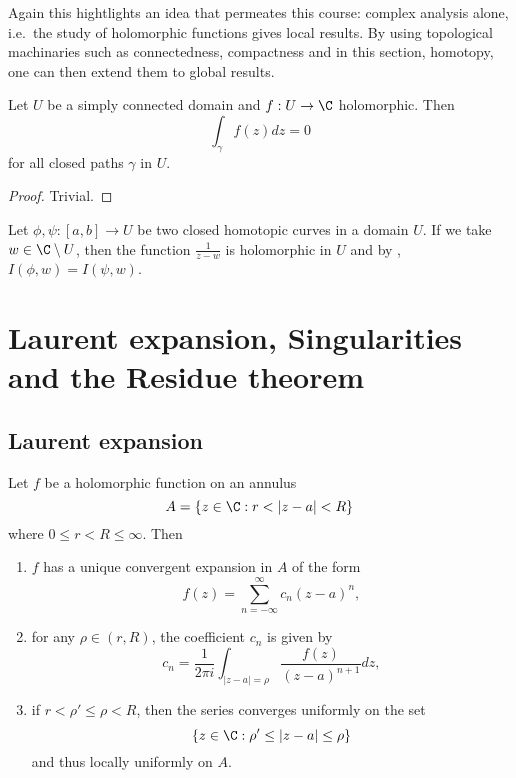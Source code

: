 \documentclass[a4paper]{article}
\begin{document}
Again this hightlights an idea that permeates this course: complex analysis alone, i.e.\ the study of holomorphic functions gives local results. By using topological machinaries such as connectedness, compactness and in this section, homotopy, one can then extend them to global results.

\begin{corollary}
  Let \(U\) be a simply connected domain and \(f: U \to \C\) holomorphic. Then
  \[
    \int_\gamma f(z)dz = 0
  \]
  for all closed paths \(\gamma\) in \(U\).
\end{corollary}

\begin{proof}
  Trivial.
\end{proof}

\begin{remark}
  Let \(\phi, \psi: [a, b] \to U\) be two closed homotopic curves in a domain \(U\). If we take \(w \in \C \setminus U\), then the function \(\frac{1}{z - w}\) is holomorphic in \(U\) and by , \(I(\phi, w) = I(\psi, w)\).
\end{remark}

\section{Laurent expansion, Singularities and the Residue theorem}

\subsection{Laurent expansion}

\begin{theorem}
  Let \(f\) be a holomorphic function on an annulus
  \[
    A = \{z \in \C: r < |z - a| < R\}
  \]
  where \(0 \leq r < R \leq \infty\). Then
  \begin{enumerate}
  \item \(f\) has a unique convergent expansion in \(A\) of the form
    \begin{equation}
      \label{eqn:Laurent}
      f(z) = \sum_{n = -\infty}^\infty c_n(z - a)^n,
      \tag{\(\ast\)}
    \end{equation}
  \item for any \(\rho \in (r, R)\), the coefficient \(c_n\) is given by
    \[
      c_n = \frac{1}{2\pi i} \int_{|z - a| = \rho} \frac{f(z)}{(z - a)^{n + 1}} dz,
    \]
  \item if \(r < \rho' \leq \rho < R\), then the series converges uniformly on the set
    \[
      \{z \in \C: \rho' \leq |z - a| \leq \rho\}
    \]
    and thus locally uniformly on \(A\).
  \end{enumerate}
\end{theorem}
\end{document}
